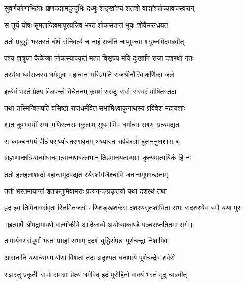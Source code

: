 \twolineshloka
{सुवर्णकोणाभिहतः प्राणदद्यामदुन्दुभिः}
{दध्मुः शङ्खांश्च शतशो वाद्यांश्चोच्चावचस्वरान्} %

\twolineshloka
{स तूर्य घोषः सुमहान्दिवमापूरयन्निव}
{भरतं शोकसंतप्तं भूयः शोकैररन्ध्रयत्} %

\twolineshloka
{ततो प्रबुद्धो भरतस्तं घोषं संनिवर्त्य च}
{नाहं राजेति चाप्युक्त्वा शत्रुघ्नमिदमब्रवीत्} %

\twolineshloka
{पश्य शत्रुघ्न कैकेय्या लोकस्यापकृतं महत्}
{विसृज्य मयि दुःखानि राजा दशरथो गतः} %

\twolineshloka
{तस्यैषा धर्मराजस्य धर्ममूला महात्मनः}
{परिभ्रमति राजश्रीर्नौरिवाकर्णिका जले} %

\twolineshloka
{इत्येवं भरतं प्रेक्ष्य विलपन्तं विचेतनम्}
{कृपणं रुरुदुः सर्वाः सस्वरं योषितस्तदा} %

\twolineshloka
{तथा तस्मिन्विलपति वसिष्ठो राजधर्मवित्}
{सभामिक्ष्वाकुनाथस्य प्रविवेश महायशाः} %

\twolineshloka
{शात कुम्भमयीं रम्यां मणिरत्नसमाकुलाम्}
{सुधर्मामिव धर्मात्मा सगणः प्रत्यपद्यत} %

\twolineshloka
{स काञ्चनमयं पीठं परार्ध्यास्तरणावृतम्}
{अध्यास्त सर्ववेदज्ञो दूताननुशशास च} %

\twolineshloka
{ब्राह्मणान्क्षत्रियान्योधानमात्यान्गणबल्लभान्}
{क्षिप्रमानयताव्यग्राः कृत्यमात्ययिकं हि नः} %

\twolineshloka
{ततो हलहलाशब्दो महान्समुदपद्यत}
{रथैरश्वैर्गजैश्चापि जनानामुपगच्छताम्} %

\twolineshloka
{ततो भरतमायान्तं शतक्रतुमिवामराः}
{प्रत्यनन्दन्प्रकृतयो यथा दशरथं तथा} %

\fourlineindentedshloka
{ह्रद इव तिमिनागसंवृतः}
{ स्तिमितजलो मणिशङ्खशर्करः}
{दशरथसुतशोभिता सभा}
{ सदशरथेव बभौ यथा पुरा} %


{॥इत्यार्षे श्रीमद्रामायणे वाल्मीकीये आदिकाव्ये अयोध्याकाण्डे पञ्चसप्ततितमः सर्गः॥}


\twolineshloka
{तामार्यगणसंपूर्णां भरतः प्रग्रहां सभाम्}
{ददर्श बुद्धिसंपन्नः पूर्णचन्द्रां निशामिव} %

\twolineshloka
{आसनानि यथान्यायमार्याणां विशतां तदा}
{अदृश्यत घनापाये पूर्णचन्द्रेव शर्वरी} %

\twolineshloka
{राज्ञस्तु प्रकृतीः सर्वाः समग्राः प्रेक्ष्य धर्मवित्}
{इदं पुरोहितो वाक्यं भरतं मृदु चाब्रवीत्} %

